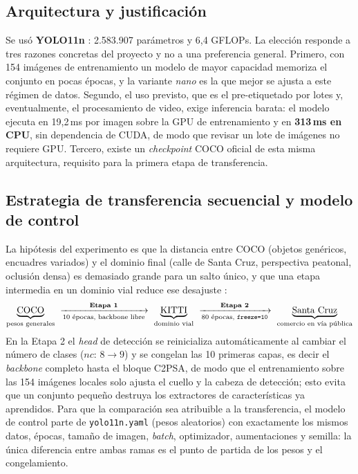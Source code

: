 \documentclass[10pt,a4paper]{article}
\begin{document}
\subsection{Arquitectura y justificación}
Se usó \textbf{YOLO11n} \cite{yolo11,ultralytics}: 2{.}583{.}907 parámetros y 6{,}4
GFLOPs. La elección responde a tres razones concretas del proyecto y no a una preferencia
general. Primero, con 154 imágenes de entrenamiento un modelo de mayor capacidad memoriza
el conjunto en pocas épocas, y la variante \emph{nano} es la que mejor se ajusta a este
régimen de datos. Segundo, el uso previsto, que es el pre-etiquetado por lotes y,
eventualmente, el procesamiento de video, exige inferencia barata: el modelo ejecuta en 19{,}2\,ms por
imagen sobre la GPU de entrenamiento y en \textbf{313\,ms en CPU}, sin dependencia de
CUDA, de modo que revisar un lote de imágenes no requiere GPU. Tercero, existe un
\emph{checkpoint} COCO \cite{coco} oficial de esta misma arquitectura, requisito para la
primera etapa de transferencia.

\subsection{Estrategia de transferencia secuencial y modelo de control}
La hipótesis del experimento es que la distancia entre COCO (objetos genéricos, encuadres
variados) y el dominio final (calle de Santa Cruz, perspectiva peatonal, oclusión densa)
es demasiado grande para un salto único, y que una etapa intermedia en un dominio vial
reduce ese desajuste \cite{yosinski}:
\[
\underbrace{\text{COCO}}_{\text{pesos generales}}
\ \xrightarrow[\text{10 épocas, backbone libre}]{\textbf{Etapa 1}}\
\underbrace{\text{KITTI}}_{\text{dominio vial}}
\ \xrightarrow[\text{80 épocas, \texttt{freeze=10}}]{\textbf{Etapa 2}}\
\underbrace{\text{Santa Cruz}}_{\text{comercio en vía pública}}
\]
En la Etapa 2 el \emph{head} de detección se reinicializa automáticamente al cambiar el
número de clases ($nc$: $8 \rightarrow 9$) y se congelan las 10 primeras capas, es decir el
\emph{backbone} completo hasta el bloque C2PSA, de modo que el entrenamiento sobre las
154 imágenes locales solo ajusta el cuello y la cabeza de detección; esto evita que un
conjunto pequeño destruya los extractores de características ya aprendidos. Para que la
comparación sea atribuible a la transferencia, el modelo de control parte de
\texttt{yolo11n.yaml} (pesos aleatorios) con exactamente los mismos datos, épocas, tamaño
de imagen, \emph{batch}, optimizador, aumentaciones y semilla: la única diferencia entre
ambas ramas es el punto de partida de los pesos y el congelamiento.
\end{document}
